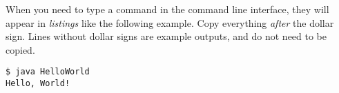 When you need to type a command in the command line interface, they will appear in \textit{listings} like the following example. Copy everything \textit{after} the dollar sign. Lines without dollar signs are example outputs, and do not need to be copied.
			
\begin{lstlisting}[style=Terminal]
$ java HelloWorld
Hello, World!
\end{lstlisting}